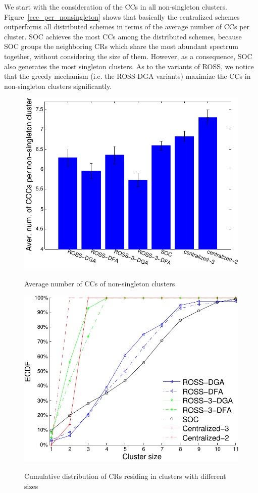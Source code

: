\documentclass[times]{ettauth}
\theoremstyle{mytheoremstyle}
\theoremstyle{mytheoremstyle}
\theoremstyle{mytheoremstyle}
\begin{document}
We start with the consideration of the CCs in all non-singleton clusters.
Figure~\ref{ccc_per_nonsingleton} shows that basically the centralized schemes outperforms all distributed schemes in terms of the average number of CCs per cluster.
SOC achieves the most CCs among the distributed schemes, because SOC groups the neighboring CRs which share the most abundant spectrum together, without considering the size of them.
However, as a consequence, SOC also generates the most singleton clusters.
As to the variants of ROSS, we notice that the greedy mechanism (i.e. the ROSS-DGA variants) maximize the CCs in non-singleton clusters significantly.
\begin{figure}[th]
\begin{multicols}{3}
    \includegraphics[width=\linewidth]{ccc_20.pdf}\par\caption{Average number of CCs of non-singleton clusters}\label{ccc_per_nonsingleton}
    \includegraphics[width=\linewidth]{cdf_clusterSize_20.pdf}\par\caption{Cumulative distribution of CRs residing in clusters with different sizes}\label{size_control}    

\end{multicols}
\end{figure}
\end{document}
